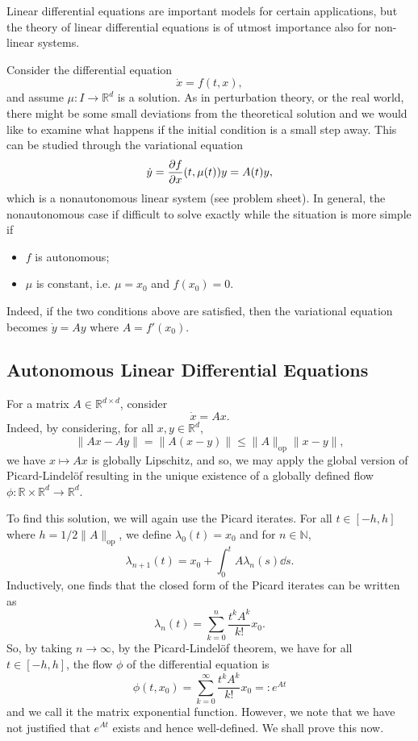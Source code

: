 \documentclass[
]{article}
\theoremstyle{definition}
\theoremstyle{definition}
\begin{document}
Linear differential equations are important models for certain
applications, but the theory of linear differential equations is of
utmost importance also for non-linear systems.

Consider the differential equation \[\dot x = f(t, x),\] and assume
\(\mu : I \to \mathbb{R}^d\) is a solution. As in perturbation theory,
or the real world, there might be some small deviations from the
theoretical solution and we would like to examine what happens if the
initial condition is a small step away. This can be studied through the
variational equation
\[\dot y = \pdv{f}{x}\hspace{0mm}(t, \mu(t))y = A(t)y,\] which is a
nonautonomous linear system (see problem sheet). In general, the
nonautonomous case if difficult to solve exactly while the situation is
more simple if

\begin{itemize}
  \item \(f\) is autonomous;
  \item \(\mu\) is constant, i.e. \(\mu = x_0\) and \(f(x_0) = 0\).
\end{itemize}

Indeed, if the two conditions above are satisfied, then the variational
equation becomes \(\dot y = Ay\) where \(A = f'(x_0)\).

\hypertarget{autonomous-linear-differential-equations}{%
\subsection{Autonomous Linear Differential
Equations}\label{autonomous-linear-differential-equations}}

For a matrix \(A \in \mathbb{R}^{d \times d}\), consider
\[\dot x = A x.\] Indeed, by considering, for all
\(x, y \in \mathbb{R}^d\),
\[\|Ax - Ay\| = \|A(x - y)\| \le \|A\|_\text{op}\|x - y\|,\] we have
\(x \mapsto A x\) is globally Lipschitz, and so, we may apply the global
version of Picard-Lindelöf resulting in the unique existence of a
globally defined flow
\(\phi : \mathbb{R} \times \mathbb{R}^d \to \mathbb{R}^d\).

To find this solution, we will again use the Picard iterates. For all
\(t \in [-h, h]\) where \(h = 1 / 2\|A\|_\text{op}\), we define
\(\lambda_0(t) = x_0\) and for \(n \in \mathbb{N}\),
\[\lambda_{n + 1}(t) = x_0 + \int_0^t A \lambda_n(s) \dd s.\]
Inductively, one finds that the closed form of the Picard iterates can
be written as \[\lambda_n(t) = \sum_{k = 0}^n \frac{t^k A^k}{k!} x_0.\]
So, by taking \(n \to \infty\), by the Picard-Lindelöf theorem, we have
for all \(t \in [-h, h]\), the flow \(\phi\) of the differential
equation is
\[\phi(t, x_0) = \sum_{k = 0}^\infty\frac{t^k A^k}{k!}x_0 =: e^{At}\]
and we call it the matrix exponential function. However, we note that we
have not justified that \(e^{At}\) exists and hence well-defined. We
shall prove this now.
\end{document}
